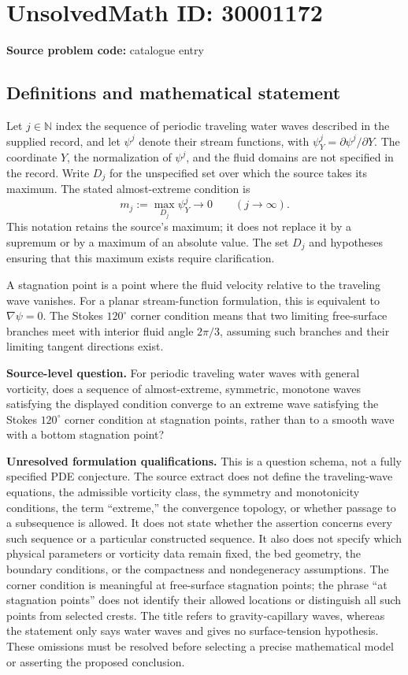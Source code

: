 \documentclass[11pt]{article}
\newcommand{\N}{\mathbb{N}}
\begin{document}
\section*{UnsolvedMath ID: 30001172}
\textbf{Source problem code:} catalogue entry
\subsection{Definitions and mathematical statement}
Let $j\in\N$ index the sequence of periodic traveling water waves described in the supplied record, and let $\psi^j$ denote their stream functions, with $\psi_Y^j=\partial\psi^j/\partial Y$. The coordinate $Y$, the normalization of $\psi^j$, and the fluid domains are not specified in the record. Write $D_j$ for the unspecified set over which the source takes its maximum. The stated almost-extreme condition is
\[
 m_j:=\max_{D_j}\psi_Y^j\longrightarrow 0
 \qquad (j\to\infty).
\]
This notation retains the source's maximum; it does not replace it by a supremum or by a maximum of an absolute value. The set $D_j$ and hypotheses ensuring that this maximum exists require clarification.

A stagnation point is a point where the fluid velocity relative to the traveling wave vanishes. For a planar stream-function formulation, this is equivalent to $\nabla\psi=0$. The Stokes $120^\circ$ corner condition means that two limiting free-surface branches meet with interior fluid angle $2\pi/3$, assuming such branches and their limiting tangent directions exist.

\textbf{Source-level question.} For periodic traveling water waves with general vorticity, does a sequence of almost-extreme, symmetric, monotone waves satisfying the displayed condition converge to an extreme wave satisfying the Stokes $120^\circ$ corner condition at stagnation points, rather than to a smooth wave with a bottom stagnation point?

\textbf{Unresolved formulation qualifications.} This is a question schema, not a fully specified PDE conjecture. The source extract does not define the traveling-wave equations, the admissible vorticity class, the symmetry and monotonicity conditions, the term ``extreme,'' the convergence topology, or whether passage to a subsequence is allowed. It does not state whether the assertion concerns every such sequence or a particular constructed sequence. It also does not specify which physical parameters or vorticity data remain fixed, the bed geometry, the boundary conditions, or the compactness and nondegeneracy assumptions. The corner condition is meaningful at free-surface stagnation points; the phrase ``at stagnation points'' does not identify their allowed locations or distinguish all such points from selected crests. The title refers to gravity-capillary waves, whereas the statement only says water waves and gives no surface-tension hypothesis. These omissions must be resolved before selecting a precise mathematical model or asserting the proposed conclusion.
\end{document}

